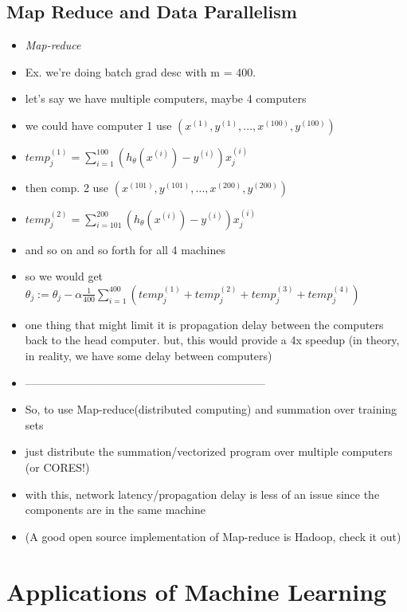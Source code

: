 \documentclass[]{article}
\begin{document}
	\subsection{Map Reduce and Data Parallelism}
		\begin{itemize}
			\item \emph{Map-reduce}
			\item Ex. we're doing batch grad desc with m = 400.
			\item let's say we have multiple computers, maybe 4 computers
			\item we could have computer 1 use $(x^{(1)},y^{(1)},...,x^{(100)},y^{(100)})$
			\item $temp_j^{(1)} = \sum\limits_{i=1}^{100}(h_{\theta}(x^{(i)})-y^{(i)})x_j^{(i)}$
			\item then comp. 2 use  $(x^{(101)},y^{(101)},...,x^{(200)},y^{(200)})$
			\item $temp_j^{(2)} = \sum\limits_{i=101}^{200}(h_{\theta}(x^{(i)})-y^{(i)})x_j^{(i)}$
			\item and so on and so forth for all 4 machines
			\item so we would get $\theta_j := \theta_j-\alpha\frac{1}{400}\sum\limits_{i=1}^{400}(temp_j^{(1)}+temp_j^{(2)}+temp_j^{(3)}+temp_j^{(4)})$
			\item one thing that might limit it is propagation delay between the computers back to the head computer. but, this would provide a 4x speedup (in theory, in reality, we have some delay between computers)
			\item -----------------------------------------------------------------
			\item So, to use Map-reduce(distributed computing) and summation over training sets
			\item just distribute the summation/vectorized program over multiple computers (or CORES!)
			\item with this, network latency/propagation delay is less of an issue since the components are in the same machine
			\item (A good open source implementation of Map-reduce is Hadoop, check it out)
		\end{itemize}
		
\section{Applications of Machine Learning}
\end{document}
